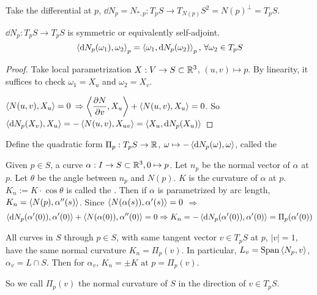 Take the differential at  $ p $,  $ \dd N_p=N_{*,p}:T_pS\rightarrow T_{N(p)}S^2=N(p)^{\perp}=T_pS $.

\begin{proposition}
     $ \dd N_p:T_pS\rightarrow T_pS $ is symmetric or equivalently self-adjoint. \ie 
     \[\left<\mathrm{d} N_p(\omega_1),\omega_2\right>_p=\left<\omega_1,\mathrm{d} N_p(\omega_2)\right>_p,\,\forall \omega_2 \in T_pS\]
\end{proposition}
\begin{proof}
    Take local parametrization $ X :V\rightarrow S\subset \mathbb R^3 $,  $ (u,v)\mapsto p $.
    By linearity, it suffices to check  $ \omega_1=X_u $ and  $ \omega_2=X_v $.
    
     $ \left<N(u,v),X_u\right>=0 $  $ \Rightarrow\left<\displaystyle\frac{\partial N }{\partial v},X_u\right>+\left<N(u,v),X_{u}\right>=0 $. So  $ \left<\mathrm{d} N_p(X_v),X_u\right>=-\left<N(u,v),X_{uv}\right>=\left<X_u,\mathrm{d} N_p(X_u)\right> $ 
\end{proof}

Define the quadratic form  $ \Pi_p:T_pS\rightarrow \mathbb R $,  $ \omega\mapsto -\left<\mathrm{d} N_p(\omega),\omega\right> $, called the   

\begin{definition}
    Given  $ p\in S $, a curve  $ \alpha:I\rightarrow S\subset \mathbb R^3, 0\mapsto p $. Let  $ n_p  $ be the normal vector of  $ \alpha  $ at  $ p  $. Let  $ \theta $ be the angle between  $ n_p $ and  $ N(p) $.  $ K  $ is the curvature of  $ \alpha  $ at  $ p $.  $ K_n:=K\cdot\cos\theta $ is called the . Then if  $ \alpha $ is parametrized by arc length,  $ K_n=\left<N(p),\alpha''(s)\right> $. Since $ \left<N(\alpha(s)),\alpha'(s)\right>=0 $ $ \Rightarrow $ 
    \[\left<\mathrm{d} N_p(\alpha'(0)),\alpha'(0)\right>+\left<N(\alpha(0)),\alpha''(0)\right>=0\Rightarrow K_n=-\left<\mathrm{d} N_p(\alpha'(0)),\alpha'(0)\right>=\Pi_p(\alpha'(0))\]

    
\end{definition}
\begin{theorem}[Meusnier]\label{Meusnier theorem}
    All curves in  $ S $ through  $ p\in S $, with same tangent vector  $ v\in T_pS $ at  $ p $,  $ |v|=1 $, have the same normal curvature  $ K_n=\Pi_p(v) $. In particular,  $ L_v=\mathrm{Span}\left<N_p,v\right> $,  $ \alpha_v=L\cap S $. Then for  $ \alpha_v $,  $ K_n=\pm K\text{ at }p=\Pi_p(v) $. 
    
    So we call  $ \Pi_p(v) $ the normal curvature of  $ S $ in the direction of  $ v\in T_pS $.  
\end{theorem}